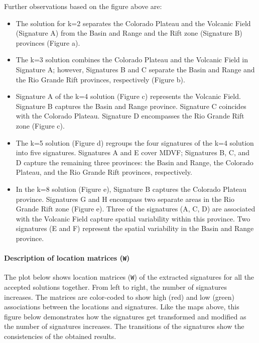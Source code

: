 \documentclass[11pt]{article}
\providecommand{\tightlist}{%
      \setlength{\itemsep}{0pt}\setlength{\parskip}{0pt}}
\begin{document}
Further observations based on the figure above are:

\begin{itemize}
\tightlist
\item
  The solution for k=2 separates the Colorado Plateau and the Volcanic
  Field (Signature A) from the Basin and Range and the Rift zone
  (Signature B) provinces (Figure a).
\item
  The k=3 solution combines the Colorado Plateau and the Volcanic Field
  in Signature A; however, Signatures B and C separate the Basin and
  Range and the Rio Grande Rift provinces, respectively (Figure b).
\item
  Signature A of the k=4 solution (Figure c) represents the Volcanic
  Field. Signature B captures the Basin and Range province. Signature C
  coincides with the Colorado Plateau. Signature D encompasses the Rio
  Grande Rift zone (Figure c).
\item
  The k=5 solution (Figure d) regroups the four signatures of the k=4
  solution into five signatures. Signatures A and E cover MDVF;
  Signatures B, C, and D capture the remaining three provinces: the
  Basin and Range, the Colorado Plateau, and the Rio Grande Rift
  provinces, respectively.
\item
  In the k=8 solution (Figure e), Signature B captures the Colorado
  Plateau province. Signatures G and H encompass two separate areas in
  the Rio Grande Rift zone (Figure e). Three of the signatures (A, C, D)
  are associated with the Volcanic Field capture spatial variability
  within this province. Two signatures (E and F) represent the spatial
  variability in the Basin and Range province.
\end{itemize}

    \hypertarget{description-of-location-matrices-w}{%
\paragraph{\texorpdfstring{Description of location matrices
(\texttt{W})}{Description of location matrices (W)}}\label{description-of-location-matrices-w}}

The plot below shows location matrices (\texttt{W}) of the extracted
signatures for all the accepted solutions together. From left to right,
the number of signatures increases. The matrices are color-coded to show
high (red) and low (green) associations between the locations and
signatures. Like the maps above, this figure below demonstrates how the
signatures get transformed and modified as the number of signatures
increases. The transitions of the signatures show the consistencies of
the obtained results.
\end{document}
